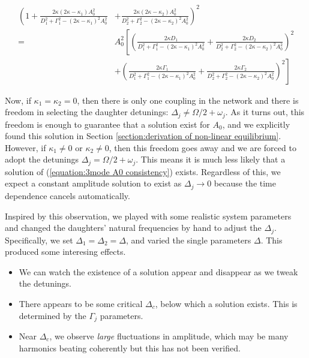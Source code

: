 \begin{subequations}\label{equation:3mode A0 consistency}
\begin{align}
\left( 1 + \frac{2\kappa (2\kappa-\kappa_1) A_0^2}{D_1^2 + \Gamma_1^2 - (2\kappa - \kappa_1)^2 A_{0}^2} \right.&\left. + \frac{2\kappa (2\kappa-\kappa_2) A_0^2}{D_2^2 + \Gamma_2^2 - (2\kappa - \kappa_2)^2 A_{0}^2} \right)^2 \\ 
= & A_0^2 \left[ \left( \frac{2\kappa D_1}{D_1^2 + \Gamma_1^2 - (2\kappa - \kappa_1)^2 A_{0}^2} + \frac{2\kappa D_2}{D_2^2 + \Gamma_2^2 - (2\kappa - \kappa_2)^2 A_{0}^2} \right)^2 \right. \\ 
 & \left. + \left( \frac{2\kappa \Gamma_1}{D_1^2 + \Gamma_1^2 - (2\kappa - \kappa_1)^2 A_{0}^2} + \frac{2\kappa \Gamma_2}{D_2^2 + \Gamma_2^2 - (2\kappa - \kappa_2)^2 A_{0}^2} \right)^2 \right]
\end{align}
\end{subequations}

Now, if $\kappa_1=\kappa_2=0$, then there is only one coupling in the network and there is freedom in selecting the daughter detunings: $\Delta_j\neq \Omega/2 + \omega_j$. As it turns out, this freedom is enough to guarantee that a solution exist for $A_0$, and we explicitly found this solution in Section \ref{section:derivation of non-linear equilibrium}.
However, if $\kappa_1\neq0$ or $\kappa_2\neq0$, then this freedom goes away and we are forced to adopt the detunings $\Delta_j = \Omega/2 + \omega_j$. This means it is much less likely that a solution of (\ref{equation:3mode A0 consistency}) exists. Regardless of this, we expect a constant amplitude solution to exist as $\Delta_j \rightarrow 0$ because the time dependence cancels automatically.

Inspired by this observation, we played with some realistic system parameters and changed the daughters' natural frequencies by hand to adjust the $\Delta_j$. Specifically, we set $\Delta_1=\Delta_2=\Delta$, and varied the single parameters $\Delta$. This produced some interesing effects.


\begin{itemize}
  \item{We can watch the existence of a solution appear and disappear as we tweak the detunings.}
  \item{There appears to be some critical $\Delta_c$, below which a solution exists. This is determined by the $\Gamma_j$ parameters.}
  \item{Near $\Delta_c$, we observe \emph{large} fluctuations in amplitude, which may be many harmonics beating coherently but this has not been verified.}
\end{itemize}

